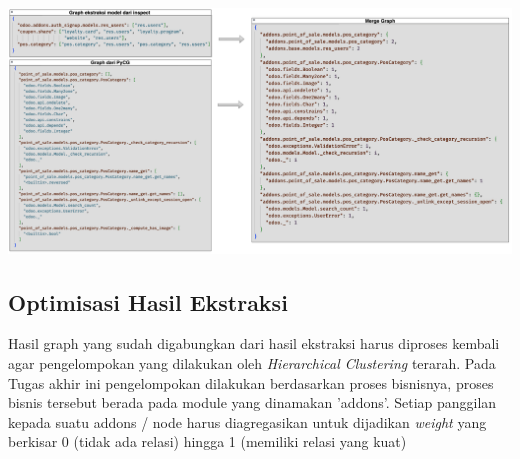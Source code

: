 \begin{center}
	\includegraphics[width=14cm]{img/bab_4/ekstraksi_5.png}
	\label{fig:ekstraksi_5}
\end{center}

\subsection{Optimisasi Hasil Ekstraksi}
Hasil graph yang sudah digabungkan dari hasil ekstraksi harus diproses kembali agar pengelompokan yang dilakukan oleh \textit{Hierarchical Clustering} terarah. Pada Tugas akhir ini pengelompokan dilakukan berdasarkan proses bisnisnya, proses bisnis tersebut berada pada module yang dinamakan 'addons'. Setiap panggilan kepada suatu addons / node harus diagregasikan untuk dijadikan \textit{weight} yang berkisar 0 (tidak ada relasi) hingga 1 (memiliki relasi yang kuat)


